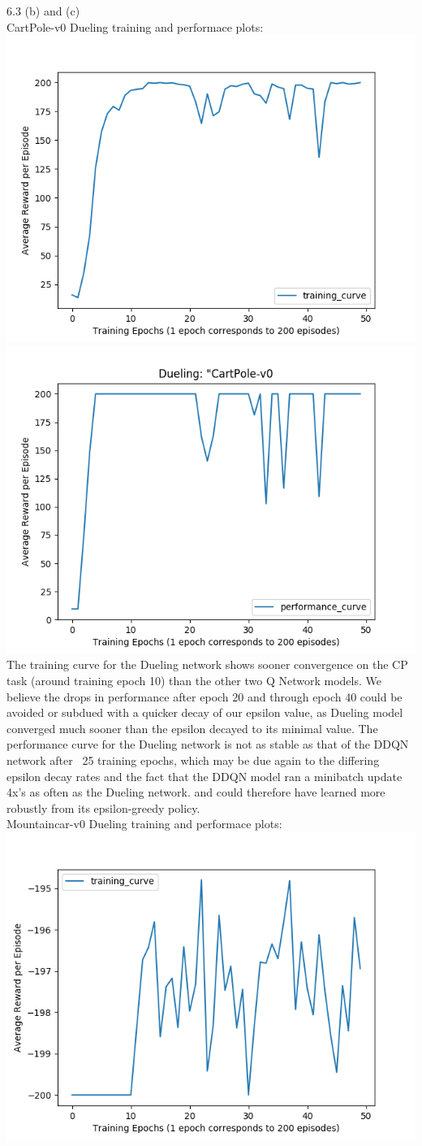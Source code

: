 \documentclass[12pt]{article}
\begin{document}
    \begin{tcolorbox}[fit,height=22cm, width=\textwidth, blank, borderline={1pt}{-2pt},nobeforeafter]
    {\large 6.3  (b) and (c)} \\
    {\large CartPole-v0 Dueling training and performace plots:} \\
    \includegraphics[width=.5\textwidth]{figures/CP_dueling_training_curve}
    \includegraphics[width=.5\textwidth]{figures/CP_dueling_performance_curve} 
    The training curve for the Dueling network shows sooner convergence on the CP task (around training epoch 10) than the other two Q Network models. We believe the drops in performance after epoch 20 and through epoch 40 could be avoided or subdued with a quicker decay of our epsilon value, as Dueling model converged much sooner than the epsilon decayed to its minimal value.  The performance curve for the Dueling network is not as stable as that of the DDQN network after ~25 training epochs, which may be due again to the differing epsilon decay rates and the fact that the DDQN model ran a minibatch update 4x's as often as the Dueling network. and could therefore have learned more robustly from its epsilon-greedy policy.\\
    {\large Mountaincar-v0 Dueling training and performace plots:} \\
    \includegraphics[width=.5\textwidth]{figures/MC_dueling_training_curve}

\end{tcolorbox}
\end{document}
